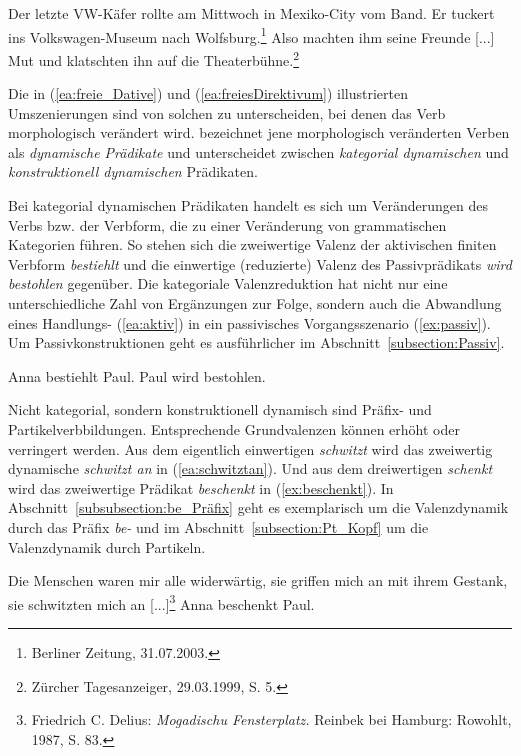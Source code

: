 \ea \label{ea:freiesDirektivum}
\ea \label{ea:knatternPP} Der letzte VW-Käfer rollte am Mittwoch in Mexiko-City vom Band. Er tuckert ins Volkswagen-Museum nach Wolfsburg.\footnote{Berliner Zeitung, 31.07.2003.}
\ex \label{ex:klatschtAkkPP} Also machten ihm seine Freunde [...] Mut und klatschten ihn auf die Theaterbühne.\footnote{Zürcher Tagesanzeiger, 29.03.1999, S. 5.}
\z 
\z 

Die in (\ref{ea:freie_Dative}) und (\ref{ea:freiesDirektivum}) illustrierten Umszenierungen sind von solchen zu unterscheiden, bei denen das Verb morphologisch verändert wird. \citet[270]{Agel2017} bezeichnet jene morphologisch veränderten Verben als \textit{dynamische Prädikate} und unterscheidet zwischen \textit{kategorial dynamischen} und \textit{konstruktionell dynamischen} Prädikaten. 

Bei kategorial dynamischen Prädikaten handelt es sich um Veränderungen des Verbs bzw. der Verbform, die zu einer Veränderung von grammatischen Kategorien führen. So stehen sich die zweiwertige Valenz der aktivischen finiten Verbform \textit{bestiehlt} und die einwertige (reduzierte) Valenz des Passivprädikats \textit{wird bestohlen} gegenüber. Die kategoriale Valenzreduktion hat nicht nur eine unterschiedliche Zahl von Ergänzungen zur Folge, sondern auch die Abwandlung eines Handlungs- (\ref{ea:aktiv}) in ein passivisches Vorgangsszenario (\ref{ex:passiv}). Um Passivkonstruktionen geht es ausführlicher im Abschnitt~\ref{subsection:Passiv}.

\ea
\ea \label{ea:aktiv} Anna bestiehlt Paul.
\ex \label{ex:passiv} Paul wird bestohlen.   
\z 
\z 

Nicht kategorial, sondern konstruktionell dynamisch sind Präfix- und Partikelverbbildungen. Entsprechende Grundvalenzen können erhöht oder verringert werden. Aus dem eigentlich einwertigen \textit{schwitzt} wird das zweiwertig dynamische \textit{schwitzt an} in (\ref{ea:schwitztan}). Und aus dem dreiwertigen \textit{schenkt} wird das zweiwertige Prädikat \textit{beschenkt} in (\ref{ex:beschenkt}). In Abschnitt~\ref{subsubsection:be_Präfix} geht es exemplarisch um die Valenzdynamik durch das Präfix \textit{be-} und im Abschnitt~\ref{subsection:Pt_Kopf} um die Valenzdynamik durch Partikeln.

\ea \label{ea:schwitztan} Die Menschen waren mir alle widerwärtig, sie griffen mich an mit ihrem Gestank, sie schwitzten mich an [...]\footnote{Friedrich C. Delius: \textit{Mogadischu Fensterplatz.} Reinbek bei Hamburg: Rowohlt, 1987, S. 83.}
\ex \label{ex:beschenkt} Anna beschenkt Paul.
\z

